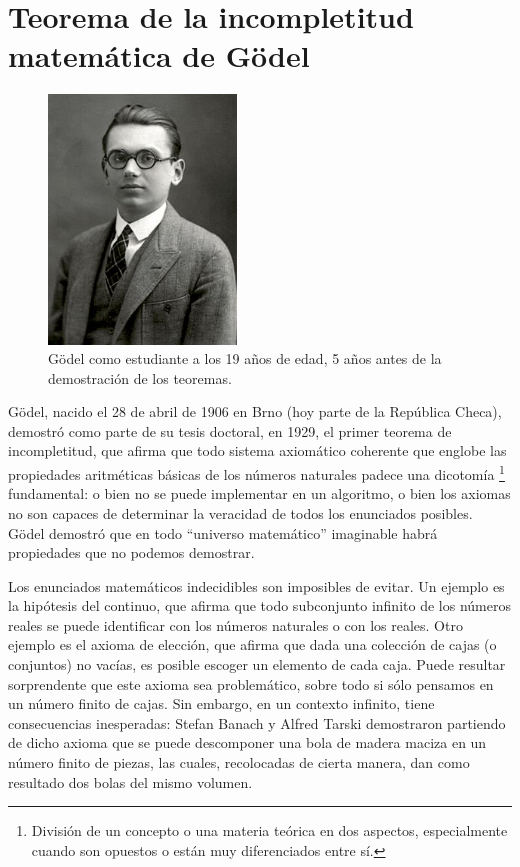 \pagebreak
\section{Teorema de la incompletitud matemática de Gödel}

\begin{figure}
    \includegraphics[width=5cm]{figures/Kurt_Godel.jpg}
    \caption{Gödel como estudiante a los 19 años de edad, 5 años antes de la 
    demostración de los teoremas.}
\end{figure}

Gödel, nacido el 28 de abril de 1906 en Brno (hoy parte de la República Checa),
demostró como parte de su tesis doctoral, en 1929, el primer teorema de
incompletitud, que afirma que todo sistema axiomático coherente que englobe las
propiedades aritméticas básicas de los números naturales padece una dicotomía
\footnote{División de un concepto o una materia teórica en dos aspectos,
especialmente cuando son opuestos o están muy diferenciados entre sí.}
fundamental: o bien no se puede implementar en un algoritmo, o bien los axiomas
no son capaces de determinar la veracidad de todos los enunciados posibles.
Gödel demostró que en todo “universo matemático” imaginable habrá propiedades
que no podemos demostrar.

Los enunciados matemáticos indecidibles son imposibles de evitar. Un ejemplo es
la hipótesis del continuo, que afirma que todo subconjunto infinito de los
números reales se puede identificar con los números naturales o con los reales.
Otro ejemplo es el axioma de elección, que afirma que dada una colección de
cajas (o conjuntos) no vacías, es posible escoger un elemento de cada caja.
Puede resultar sorprendente que este axioma sea problemático, sobre todo si sólo
pensamos en un número finito de cajas. Sin embargo, en un contexto infinito,
tiene consecuencias inesperadas: Stefan Banach y Alfred Tarski demostraron
partiendo de dicho axioma que se puede descomponer una bola de madera maciza en
un número finito de piezas, las cuales, recolocadas de cierta manera, dan como
resultado dos bolas del mismo volumen.

